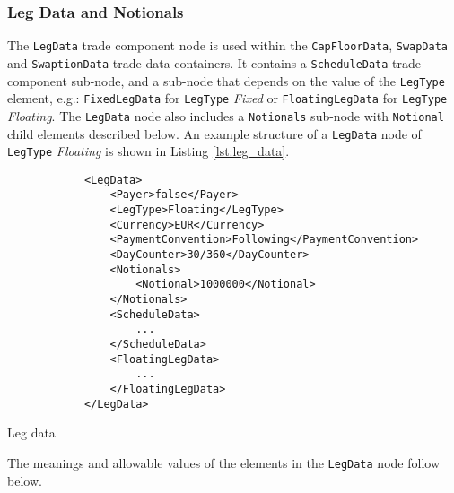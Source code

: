 \subsubsection{Leg Data and Notionals}
\label{ss:leg_data}

The \lstinline!LegData! trade component node is used within the
\lstinline!CapFloorData!,  \lstinline!SwapData! and
\lstinline!SwaptionData! trade data containers. It contains a
\lstinline!ScheduleData! trade component sub-node, and a sub-node that depends on
the value of the \lstinline!LegType! element, e.g.:  \lstinline!FixedLegData! for \lstinline!LegType! \emph{Fixed} or \lstinline!FloatingLegData! for \lstinline!LegType! \emph{Floating}. The
\lstinline!LegData! node also includes a \lstinline!Notionals!
sub-node  with \lstinline!Notional! child elements described below. An
example structure of a \lstinline!LegData! node of \lstinline!LegType!
\emph{Floating} is shown in Listing \ref{lst:leg_data}.

\begin{listing}[H]
\begin{verbatim}
            <LegData>
                <Payer>false</Payer>
                <LegType>Floating</LegType>
                <Currency>EUR</Currency>
                <PaymentConvention>Following</PaymentConvention>
                <DayCounter>30/360</DayCounter>
                <Notionals>
                    <Notional>1000000</Notional>
                </Notionals>
                <ScheduleData>
                    ...
                </ScheduleData>
                <FloatingLegData>
                    ...
                </FloatingLegData>
            </LegData>
\end{verbatim}
\caption{Leg data}
\label{lst:leg_data}
\end{listing}

The meanings and allowable values of the elements in the \lstinline!LegData! node follow below.

